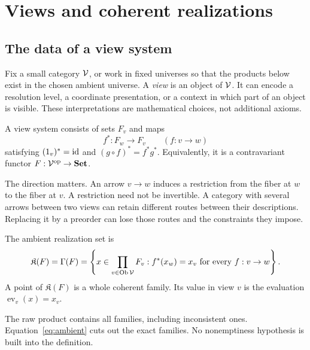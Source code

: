 \section{Views and coherent realizations}\label{sec:views}
\subsection{The data of a view system}
Fix a small category \(\mathcal V\), or work in fixed universes so that the products below exist in the chosen ambient universe. A \emph{view} is an object of \(\mathcal V\). It can encode a resolution level, a coordinate presentation, or a context in which part of an object is visible. These interpretations are mathematical choices, not additional axioms.

\begin{definition}
A view system consists of sets \(F_v\) and maps
\[
 f^*:F_w\longrightarrow F_v\qquad(f:v\longrightarrow w)
\]
satisfying \((1_v)^*=\operatorname{id}\) and \((g\circ f)^*=f^*g^*\). Equivalently, it is a contravariant functor \(F:\mathcal V^{\mathrm{op}}\to\mathbf{Set}\).
\end{definition}
The direction matters. An arrow \(v\to w\) induces a restriction from the fiber at \(w\) to the fiber at \(v\). A restriction need not be invertible. A category with several arrows between two views can retain different routes between their descriptions. Replacing it by a preorder can lose those routes and the constraints they impose.

\begin{definition}
The ambient realization set is
\begin{equation}\label{eq:ambient}
 \mathfrak K(F)=\Gamma(F)=
 \left\{x\in\prod_{v\in\operatorname{Ob}\mathcal V}F_v:
 f^*(x_w)=x_v\text{ for every }f:v\to w\right\}.
\end{equation}
A point of \(\mathfrak K(F)\) is a whole coherent family. Its value in view \(v\) is the evaluation \(\operatorname{ev}_v(x)=x_v\).
\end{definition}
The raw product contains all families, including inconsistent ones. Equation~\eqref{eq:ambient} cuts out the exact families. No nonemptiness hypothesis is built into the definition.

